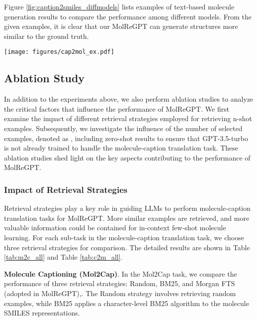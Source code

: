 \documentclass{article}
\theoremstyle{plain}
\theoremstyle{definition}
\theoremstyle{remark}
\begin{document}
Figure \ref{fig:caption2smiles_diffmodels} lists examples of text-based molecule generation results to compare the performance among different models. From the given examples, it is clear that our MolReGPT can generate structures more similar to the ground truth.
\begin{figure*}[htb]
   \centering
   \texttt{[image: figures/cap2mol\_ex.pdf]}
   \caption{Examples of molecules generated by different models, where SMILES strings are converted to molecule graphs for better visualization. Based on the same input caption, our MolReGPT can generate accurate molecule graphs described by the caption. In contrast, Transformer generates quite different molecules compared to the ground truth. Compared to Transformer, molecules generated by MolT5-base are closer to the ground truth but still miss so many details.}
   \label{fig:caption2smiles_diffmodels}
\end{figure*}

\subsection{Ablation Study}
In addition to the experiments above, we also perform ablation studies to analyze the critical factors that influence the performance of MolReGPT. We first examine the impact of different retrieval strategies employed for retrieving n-shot examples.
Subsequently, we investigate the influence of the number of selected examples, denoted as , including zero-shot results to ensure that GPT-3.5-turbo is not already trained to handle the molecule-caption translation task. These ablation studies shed light on the key aspects contributing to the performance of MolReGPT.

\subsubsection{Impact of Retrieval Strategies}
Retrieval strategies play a key role in guiding LLMs to perform molecule-caption translation tasks for MolReGPT. 
More similar examples are retrieved, and more valuable information could be contained for in-context few-shot molecule learning.
For each sub-task in the molecule-caption translation task, we choose three retrieval strategies for comparison. The detailed results are shown in Table \ref{tab:m2c_all} and Table \ref{tab:c2m_all}. 

\textbf{Molecule Captioning (Mol2Cap)}. 
In the Mol2Cap task, we compare the performance of three retrieval strategies: Random, BM25, and Morgan FTS (adopted in MolReGPT),. 
The Random strategy involves retrieving  random examples, while BM25 applies a character-level BM25 algorithm to the molecule SMILES representations.
\end{document}
